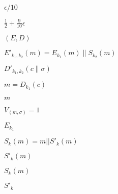 \documentclass[10pt]{book}
\begin{document}
\begin{mdSnippets}
\begin{mdInlineSnippet}[a18499b68e3b7c050e0a04741e013500]
$\epsilon/10$\end{mdInlineSnippet}%
\begin{mdInlineSnippet}[12db5681fc3e964c528211ffd3c2be74]%
$\frac{1}{2} + \frac{9}{10}\epsilon$\end{mdInlineSnippet}%
\begin{mdInlineSnippet}[c150726dc018e82825c0c3617f46a1c9]%
$(E,D)$\end{mdInlineSnippet}%
\begin{mdInlineSnippet}[02bc25f12702eeac15f68e7510bc2071]%
$E'_{k_1,k_2}(m)= E_{k_1}(m)\|S_{k_2}(m)$\end{mdInlineSnippet}%
\begin{mdInlineSnippet}%
$D'_{k_1,k_2}(c\|\sigma)$\end{mdInlineSnippet}%
\begin{mdInlineSnippet}[17e0cc6769a582d47c1cebfd21b62443]%
$m = D_{k_1}(c)$\end{mdInlineSnippet}%
\begin{mdInlineSnippet}[6f8f57715090da2632453988d9a1501b]%
$m$\end{mdInlineSnippet}%
\begin{mdInlineSnippet}[425f54b81df3729e5ac0202cbcdbe859]%
$V_(m,\sigma)=1$\end{mdInlineSnippet}%
\begin{mdInlineSnippet}%
$E_{k_1}$\end{mdInlineSnippet}%
\begin{mdInlineSnippet}%
$S_k(m) = m|| S'_k(m)$\end{mdInlineSnippet}%
\begin{mdInlineSnippet}%
$S'_k(m)$\end{mdInlineSnippet}%
\begin{mdInlineSnippet}[9f58d7eb240c4166bd35b3787be1cc6c]%
$S_k(m)$\end{mdInlineSnippet}%
\begin{mdInlineSnippet}[38b2429a43bae23cd2a16927742a72ff]%
$S'_k$\end{mdInlineSnippet}%
\begin{mdInlineSnippet}%

\end{mdInlineSnippet}
\end{mdSnippets}
\end{document}
